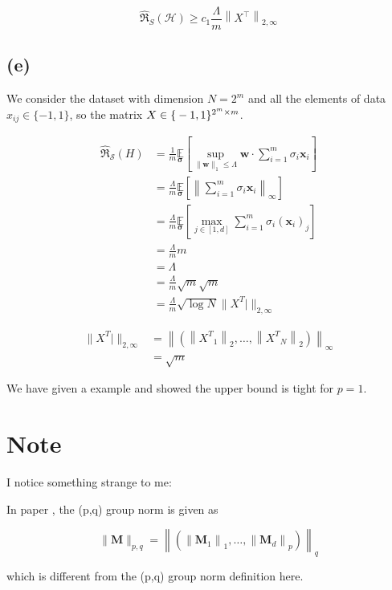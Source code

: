 \documentclass{article}
\begin{document}
\begin{equation}
    \widehat{\Re}_{S}(\mathcal{H}) \geq c_{1} \frac{\Lambda}{m}\left\|X^{\top}\right\|_{2, \infty}
\end{equation}




\subsection{(e)}

We consider the dataset with dimension $N = 2^m$ and all the elements of data $x_{ij} \in \{-1,1\}$, so the matrix $X \in \mathbf\{-1,1\}^{2^m \times m}$.

\begin{align}
\widehat{\mathfrak{R}}_{\mathcal{S}}\left(H\right)
&=\frac{1}{m} \underset{\boldsymbol{\sigma}}{\mathbb{E}}\left[\sup _{\|\mathbf{w}\|_{1} \leq \Lambda} \mathbf{w} \cdot \sum_{i=1}^{m} \sigma_{i} \mathbf{x}_{i}\right] \\
&=\frac{\Lambda}{m} \underset{\boldsymbol{\sigma}}{\mathbb{E}}\left[\left\|\sum_{i=1}^{m} \sigma_{i} \mathbf{x}_{i}\right\|_{\infty}\right] \\
&=\frac{\Lambda}{m} \underset{\boldsymbol{\sigma}}{\mathbb{E}}\left[\max _{j \in [1,d]} \sum_{i=1}^{m} \sigma_{i}\left(\mathbf{x}_{i}\right)_{j}\right] \\
&=\frac{\Lambda}{m} m \\
&=\Lambda \\
&=\frac{\Lambda}{m} \sqrt{m} \sqrt{m} \\
&=\frac{\Lambda}{m} \sqrt{\log{N}} {\|X^T|\|_{2, \infty}}
\end{align} 

\begin{align}
    {\|X^T|\|_{2, \infty}} 
    &= \left\|\left(\left\|{X^T}_{1}\right\|_{2}, \ldots,\left\|{X^T}_{N}\right\|_{2}\right)\right\|_{\infty} \\
    &= \sqrt{m}
\end{align}

We have given a example and showed the upper bound is tight for $p=1$.


\section{Note}

I notice something strange to me:

In paper \cite{awasthi2020rademacher}, the (p,q) group norm is given as

\begin{equation}
    \|\mathbf{M}\|_{p, q}=\left\|\left(\left\|\mathbf{M}_{1}\right\|_{1}, \ldots,\left\|\mathbf{M}_{d}\right\|_{p}\right)\right\|_{q}
\end{equation}

which is different from the (p,q) group norm definition here.




\nocite*{}
\end{document}
